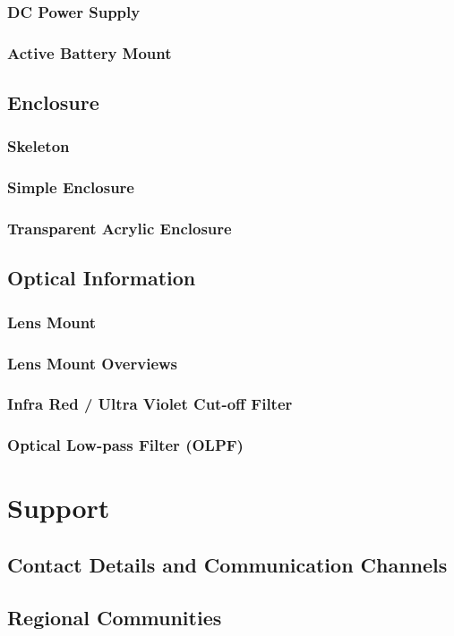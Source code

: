 \documentclass{article}
\begin{document}
\subsubsection{DC Power Supply}
\subsubsection{Active Battery Mount}
\subsection{Enclosure}
\subsubsection{Skeleton}
\subsubsection{Simple Enclosure}
\subsubsection{Transparent Acrylic Enclosure}
\subsection{Optical Information}
\subsubsection{Lens Mount}
\subsubsection{Lens Mount Overviews}
\subsubsection{Infra Red / Ultra Violet Cut-off Filter}
\subsubsection{Optical Low-pass Filter (OLPF)}

\section{Support}
\subsection{Contact Details and Communication Channels}
\subsection{Regional Communities}
\end{document}
